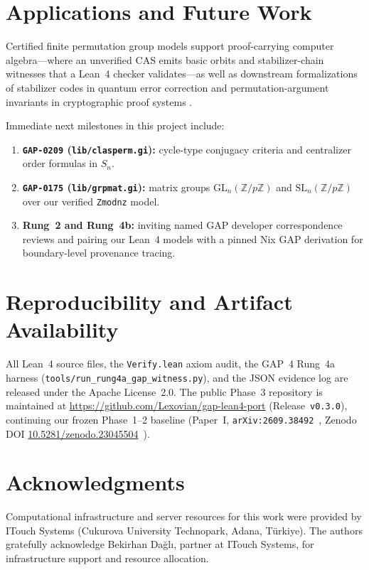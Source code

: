 \documentclass[11pt,a4paper]{article}
\begin{document}
\section{Applications and Future Work}
\label{sec:future}

Certified finite permutation group models support proof-carrying computer algebra—where an unverified CAS emits basic orbits and stabilizer-chain witnesses that a Lean~4 checker validates—as well as downstream formalizations of stabilizer codes in quantum error correction \cite{gottesman1997stabilizer} and permutation-argument invariants in cryptographic proof systems \cite{plonk2019}.

Immediate next milestones in this project include:
\begin{enumerate}
  \item \textbf{\texttt{GAP-0209} (\texttt{lib/clasperm.gi}):} cycle-type conjugacy criteria and centralizer order formulas in $S_n$.
  \item \textbf{\texttt{GAP-0175} (\texttt{lib/grpmat.gi}):} matrix groups $\mathrm{GL}_n(\mathbb{Z}/p\mathbb{Z})$ and $\mathrm{SL}_n(\mathbb{Z}/p\mathbb{Z})$ over our verified \texttt{Zmodnz} model.
  \item \textbf{Rung~2 and Rung~4b:} inviting named GAP developer correspondence reviews and pairing our Lean~4 models with a pinned Nix GAP derivation for boundary-level provenance tracing.
\end{enumerate}

\section*{Reproducibility and Artifact Availability}
All Lean~4 source files, the \texttt{Verify.lean} axiom audit, the GAP~4 Rung~4a harness (\texttt{tools/\allowbreak run\_rung4a\_\allowbreak gap\_witness.py}), and the JSON evidence log are released under the Apache License~2.0. The public Phase~3 repository is maintained at \url{https://github.com/Lexovian/gap-lean4-port} (Release~\texttt{v0.3.0}), continuing our frozen Phase~1--2 baseline (Paper~I, \texttt{arXiv:2609.38492}~\cite{dagli_2026_gap_lean4_arxiv}, Zenodo DOI \href{https://doi.org/10.5281/zenodo.23045504}{10.5281/zenodo.23045504}~\cite{dagli_2026_gap_lean4_zenodo_v020}).


\section*{Acknowledgments}
Computational infrastructure and server resources for this work were provided by ITouch Systems (Cukurova University Technopark, Adana, T\"{u}rkiye). The authors gratefully acknowledge Bekirhan Da\u{g}l\i, partner at ITouch Systems, for infrastructure support and resource allocation.



\end{document}
